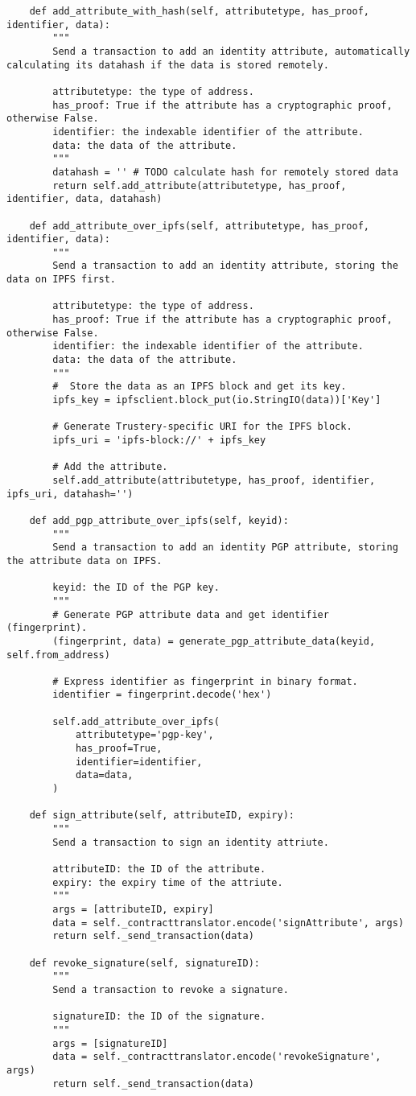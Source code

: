 \documentclass[12pt]{report}
\begin{document}
\begin{lstlisting}
    def add_attribute_with_hash(self, attributetype, has_proof, identifier, data):
        """
        Send a transaction to add an identity attribute, automatically calculating its datahash if the data is stored remotely.

        attributetype: the type of address.
        has_proof: True if the attribute has a cryptographic proof, otherwise False.
        identifier: the indexable identifier of the attribute.
        data: the data of the attribute.
        """
        datahash = '' # TODO calculate hash for remotely stored data
        return self.add_attribute(attributetype, has_proof, identifier, data, datahash)

    def add_attribute_over_ipfs(self, attributetype, has_proof, identifier, data):
        """
        Send a transaction to add an identity attribute, storing the data on IPFS first.

        attributetype: the type of address.
        has_proof: True if the attribute has a cryptographic proof, otherwise False.
        identifier: the indexable identifier of the attribute.
        data: the data of the attribute.
        """
        #  Store the data as an IPFS block and get its key.
        ipfs_key = ipfsclient.block_put(io.StringIO(data))['Key']

        # Generate Trustery-specific URI for the IPFS block.
        ipfs_uri = 'ipfs-block://' + ipfs_key

        # Add the attribute.
        self.add_attribute(attributetype, has_proof, identifier, ipfs_uri, datahash='')

    def add_pgp_attribute_over_ipfs(self, keyid):
        """
        Send a transaction to add an identity PGP attribute, storing the attribute data on IPFS.

        keyid: the ID of the PGP key.
        """
        # Generate PGP attribute data and get identifier (fingerprint).
        (fingerprint, data) = generate_pgp_attribute_data(keyid, self.from_address)

        # Express identifier as fingerprint in binary format.
        identifier = fingerprint.decode('hex')

        self.add_attribute_over_ipfs(
            attributetype='pgp-key',
            has_proof=True,
            identifier=identifier,
            data=data,
        )

    def sign_attribute(self, attributeID, expiry):
        """
        Send a transaction to sign an identity attriute.

        attributeID: the ID of the attribute.
        expiry: the expiry time of the attriute.
        """
        args = [attributeID, expiry]
        data = self._contracttranslator.encode('signAttribute', args)
        return self._send_transaction(data)

    def revoke_signature(self, signatureID):
        """
        Send a transaction to revoke a signature.

        signatureID: the ID of the signature.
        """
        args = [signatureID]
        data = self._contracttranslator.encode('revokeSignature', args)
        return self._send_transaction(data)
	\end{lstlisting}
	
\end{document}

